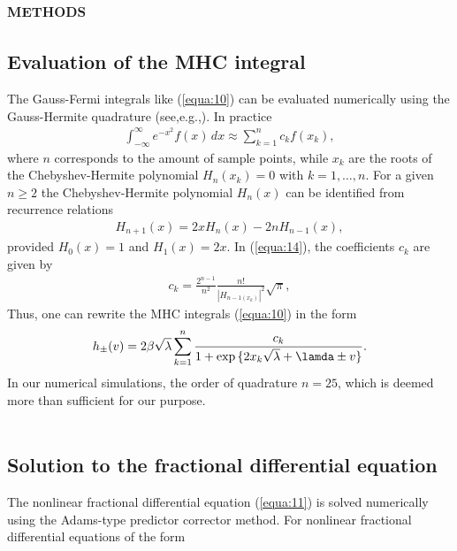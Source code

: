 \documentclass[10pt]{article}
\begin{document}
\begin{multicols}{2}
{        \section{\scshape methods}
        }
        {\centering \subsection{Evaluation of the MHC integral}}
        The Gauss-Fermi integrals like (\ref{equa:10}) can be evaluated numerically using the Gauss-Hermite quadrature (see,e.g.,). In practice
        \begin{align}
            \int_{- \infty}^\infty e^{-x^2} f(x) \,dx \approx \sum_{k=1}^n c_k f(x_k), \label{equa:14}
        \end{align}
        where $n$ corresponds to the amount of sample points, while $x_k$ are the roots of the Chebyshev-Hermite polynomial $H_n (x_k) = 0$ with $k=1,\dots,n$. For a given $n \ge 2$ the Chebyshev-Hermite polynomial $H_n (x)$ can be identified from recurrence relations
        \begin{align}
            H_{n+1}(x) = 2xH_n(x) - 2nH_{n-1}(x), \label{equa:15}
        \end{align}
        provided $H_0(x)=1$ and $H_1(x) = 2x$. In (\ref{equa:14}), the coefficients $c_k$ are given by
        \begin{align}
            c_k = \frac{2^{n-1}}{n^2} \frac{n!}{|H_{n-1 (x_k)}|^2} \sqrt{\pi}, \label{equa:16}
        \end{align}
        Thus, one can rewrite the MHC integrals (\ref{equa:10}) in the form
        \begin{align}
            h_{\pm}(v)=2 \beta \sqrt{\lambda} \sum_{k=1}^n \frac{c_k}{1+\exp{\{2x_k \sqrt{\lambda} + \lamda \pm v\}}}. \label{equa:17}
        \end{align}
        In our numerical simulations, the order of quadrature $n = 25$, which is deemed more than sufficient for our purpose.
        \\
        \\
        \par
        {\centering \subsection{Solution to the fractional differential equation}}
        The nonlinear fractional differential equation (\ref{equa:11}) is solved numerically using the Adams-type predictor corrector method. For nonlinear fractional differential equations of the form

\end{multicols}
\end{document}

